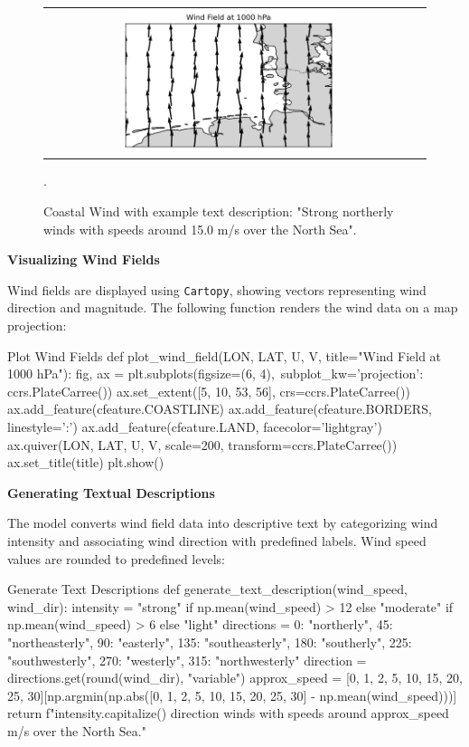 \begin{figure}[h]
    \centering
    \begin{tabular}{cc}
        \includegraphics[width=0.6\textwidth]{images/coastal_wind.png} & 
    \end{tabular}. 
    \caption{Coastal Wind with example text description: "Strong northerly winds with speeds around 15.0 m/s over the North Sea".
}
    \label{fig:coastal_wind}
\end{figure}

{\bf Visualizing Wind Fields}

Wind fields are displayed using {\tt Cartopy}, showing vectors representing wind direction and magnitude. The following function renders the wind data on a map projection:

\begin{codeonly}{Plot Wind Fields}
def plot_wind_field(LON, LAT, U, V, title="Wind Field at 1000 hPa"):
    fig, ax = plt.subplots(figsize=(6, 4),\ 
		subplot_kw={'projection': ccrs.PlateCarree()})
    ax.set_extent([5, 10, 53, 56], crs=ccrs.PlateCarree())
    ax.add_feature(cfeature.COASTLINE)
    ax.add_feature(cfeature.BORDERS, linestyle=':')
    ax.add_feature(cfeature.LAND, facecolor='lightgray')
    ax.quiver(LON, LAT, U, V, scale=200, transform=ccrs.PlateCarree())
    ax.set_title(title)
    plt.show()
\end{codeonly}

{\bf Generating Textual Descriptions}

The model converts wind field data into descriptive text by categorizing wind intensity and associating wind direction with predefined labels. Wind speed values are rounded to predefined levels:

\begin{codeonly}{Generate Text Descriptions}
def generate_text_description(wind_speed, wind_dir):
    intensity = "strong" if np.mean(wind_speed) > 12 else "moderate" if np.mean(wind_speed) > 6 else "light"
    directions = {0: "northerly", 45: "northeasterly", 90: "easterly", 135: "southeasterly",
                  180: "southerly", 225: "southwesterly", 270: "westerly", 315: "northwesterly"}
    direction = directions.get(round(wind_dir), "variable")
    approx_speed = [0, 1, 2, 5, 10, 15, 20, 25, 30][np.argmin(np.abs([0, 1, 2, 5, 10, 15, 20, 25, 30] - np.mean(wind_speed)))]
    return f"{intensity.capitalize()} {direction} winds with speeds around {approx_speed} m/s over the North Sea."
\end{codeonly}

